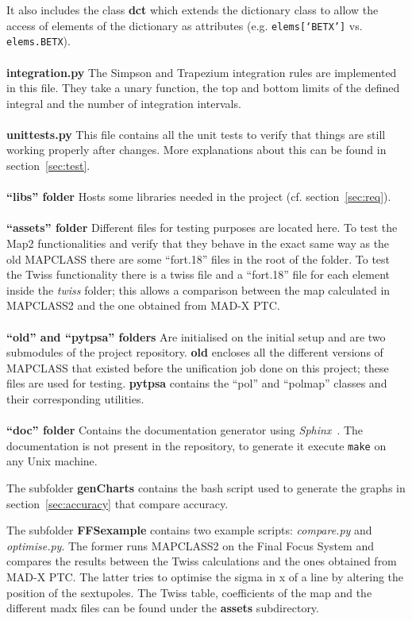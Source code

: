 \documentclass[a4paper]{cernatsnote}
\begin{document}
It also includes the class \textbf{dct} which extends the dictionary
class to allow the access of elements of the dictionary as attributes
(e.g. \texttt{elems[`BETX']} vs. \texttt{elems.BETX}).
\\\\
\textbf{integration.py}
The Simpson and Trapezium integration rules are implemented in this
file. They take a unary function, the top and bottom limits of the
defined integral and the number of integration intervals.
\\\\
\textbf{unittests.py}
This file contains all the unit tests to verify that things are still
working properly after changes. More explanations about this can be found in
section~\ref{sec:test}.
\\\\
\textbf{``libs'' folder}
Hosts some libraries needed in the project (cf.
section~\ref{sec:req}).
\\\\
\textbf{``assets'' folder}
Different files for testing purposes are located here. To test the
Map2 functionalities and verify that they behave in the exact same way
as the old \textsc{MAPCLASS} there are some ``fort.18'' files in the
root of the folder. To test the Twiss functionality there is a twiss
file and a ``fort.18'' file for each element inside the \textit{twiss}
folder; this allows a comparison between the map calculated in
\textsc{MAPCLASS2} and the one obtained from MAD-X PTC.
\\\\
\textbf{``old'' and ``pytpsa'' folders}
Are initialised on the initial setup and are two submodules of the
project repository. \textbf{old} encloses all the different versions
of \textsc{MAPCLASS} that existed before the unification job done on
this project; these files are used for testing. \textbf{pytpsa}
contains the ``pol'' and ``polmap'' classes and their corresponding
utilities.
\\\\
\textbf{``doc'' folder}
Contains the documentation generator using
\textit{Sphinx}~\cite{sphinx}. The documentation is not present in the
repository, to generate it execute \texttt{make} on any Unix machine.

The subfolder \textbf{genCharts} contains the bash script used to
generate the graphs in section~\ref{sec:accuracy} that compare
accuracy.

The subfolder \textbf{FFSexample} contains two example scripts:
\textit{compare.py} and \textit{optimise.py}. The former runs
\textsc{MAPCLASS2} on the Final Focus System and compares the results
between the Twiss calculations and the ones obtained from MAD-X PTC.
The latter tries to optimise the sigma in x of a line by altering the
position of the sextupoles. The Twiss table, coefficients of the map
and the different madx files can be found under the \textbf{assets}
subdirectory.
\end{document}
